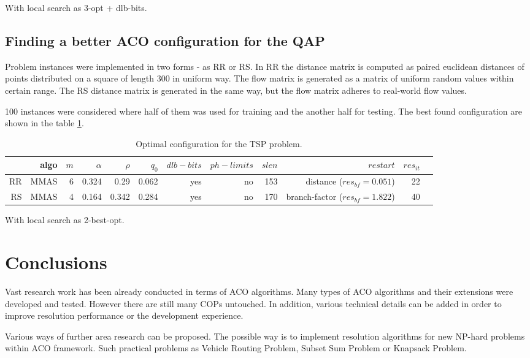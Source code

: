 \documentclass[12pt]{article}
\begin{document}
With local search as 3-opt + dlb-bits.

\subsection{Finding a better ACO configuration for the QAP}

Problem instances were implemented in two forms - as RR or RS. In RR the distance matrix is computed as paired euclidean distances of points distributed on a square of length 300 in uniform way. The flow matrix is generated as a matrix of uniform random values within certain range. The RS distance matrix is generated in the same way, but the flow matrix adheres to real-world flow values.

100 instances were considered where half of them was used for training and the another half for testing. The best found configuration are shown in the table \ref{table:table-qap}.

\begin{table}[ht]
\centering
\resizebox{\textwidth}{!}
{
\begin{tabular}{|r|r|r|r|r|r|r|r|r|r|r|r|}
  \hline 
    & algo & $m$ & $\alpha$ & $\rho$ & $q_0$ & $dlb-bits$ & $ph-limits$ & $slen$ & $restart$ & $res_{it}$\\ \hline
    RR & MMAS & 6 & 0.324 & 0.29 & 0.062 & yes & no & 153 & distance ($res_{bf} = 0.051$) & 22\\ \hline
	RS & MMAS & 4 & 0.164 & 0.342 & 0.284 & yes & no & 170 & branch-factor ($res_{bf} = 1.822$) & 40\\ \hline
\end{tabular}
}
\caption{Optimal configuration for the TSP problem.}
\label{table:table-qap} 
\end{table} 

With local search as 2-best-opt.

\section{Conclusions}

Vast research work has been already conducted in terms of ACO algorithms. Many types of ACO algorithms and their extensions were developed and tested. However there are still many COPs untouched. In addition, various technical details can be added in order to improve resolution performance or the development experience. 

Various ways of further area research can be proposed. The possible way is to implement resolution algorithms for new NP-hard problems within ACO framework. Such practical problems as Vehicle Routing Problem, Subset Sum Problem or Knapsack Problem.
\end{document}
